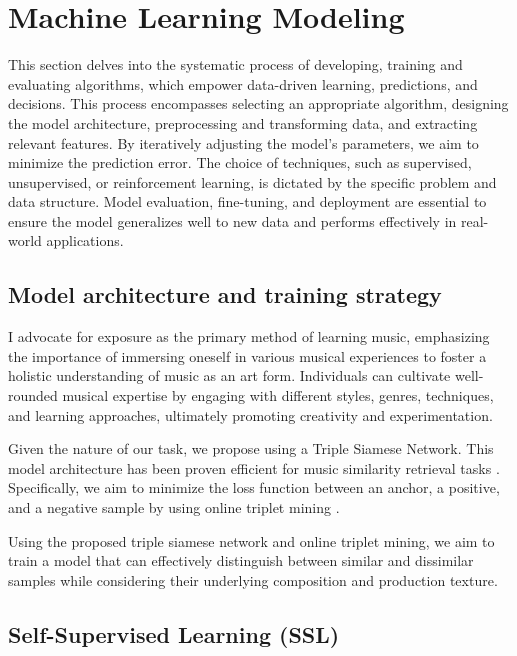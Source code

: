 \section{Machine Learning Modeling}

This section delves into the systematic process of developing, training and evaluating algorithms, which empower data-driven learning, predictions, and decisions. This process encompasses selecting an appropriate algorithm, designing the model architecture, preprocessing and transforming data, and extracting relevant features. By iteratively adjusting the model's parameters, we aim to minimize the prediction error. The choice of techniques, such as supervised, unsupervised, or reinforcement learning, is dictated by the specific problem and data structure. Model evaluation, fine-tuning, and deployment are essential to ensure the model generalizes well to new data and performs effectively in real-world applications.

\subsection{Model architecture and training strategy}

I advocate for exposure as the primary method of learning music, emphasizing the importance of immersing oneself in various musical experiences to foster a holistic understanding of music as an art form. Individuals can cultivate well-rounded musical expertise by engaging with different styles, genres, techniques, and learning approaches, ultimately promoting creativity and experimentation.

Given the nature of our task, we propose using a Triple Siamese Network. This model architecture has been proven efficient for music similarity retrieval tasks \cite{contentmusicsimtriplet2020}. Specifically, we aim to minimize the loss function between an anchor, a positive, and a negative sample by using online triplet mining \cite{Sikaroudi2020OfflinePatches}.

Using the proposed triple siamese network and online triplet mining, we aim to train a model that can effectively distinguish between similar and dissimilar samples while considering their underlying composition and production texture.

\subsection{Self-Supervised Learning (SSL)}

